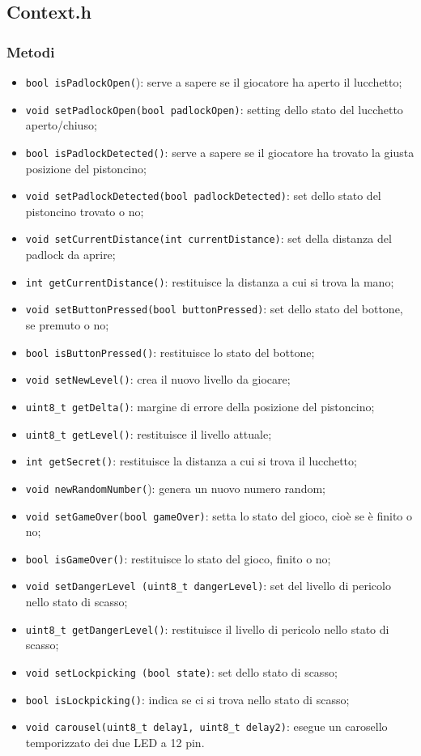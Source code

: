 \subsection{Context.h}
\subsubsection{Metodi}
\begin{itemize}
	\item \texttt{bool isPadlockOpen(}): serve a sapere se il giocatore ha aperto il lucchetto;
	\item \texttt{void setPadlockOpen(bool padlockOpen)}: setting dello stato del lucchetto aperto/chiuso;
	\item \texttt{bool isPadlockDetected()}: serve a sapere se il giocatore ha trovato la giusta posizione del pistoncino;
	\item \texttt{void setPadlockDetected(bool padlockDetected)}: set dello stato del pistoncino trovato o no;
	\item \texttt{void setCurrentDistance(int currentDistance)}: set della distanza del padlock da aprire;
	\item \texttt{int getCurrentDistance()}: restituisce la distanza a cui si trova la mano;
	\item \texttt{void setButtonPressed(bool buttonPressed)}: set dello stato del bottone, se premuto o no;
	\item \texttt{bool isButtonPressed()}: restituisce lo stato del bottone;
	\item \texttt{void setNewLevel()}: crea il nuovo livello da giocare;
	\item \texttt{uint8\_t getDelta()}: margine di errore della posizione del pistoncino;
	\item \texttt{uint8\_t getLevel()}: restituisce il livello attuale;
	\item \texttt{int getSecret()}: restituisce la distanza a cui si trova il lucchetto;
	\item \texttt{void newRandomNumber(}): genera un nuovo numero random;
	\item \texttt{void setGameOver(bool gameOver)}: setta lo stato del gioco, cioè se è finito o no;
	\item \texttt{bool isGameOver()}: restituisce lo stato del gioco, finito o no;
	\item \texttt{void setDangerLevel (uint8\_t dangerLevel)}:  set del livello di pericolo nello stato di scasso;
	\item \texttt{uint8\_t getDangerLevel()}: restituisce il livello di pericolo nello stato di scasso;
	\item \texttt{void setLockpicking (bool state)}: set dello stato di scasso;
	\item \texttt{bool isLockpicking()}: indica se ci si trova nello stato di scasso;
	\item \texttt{void carousel(uint8\_t delay1, uint8\_t delay2)}: esegue un carosello temporizzato dei due LED a 12 pin.
\end{itemize}
